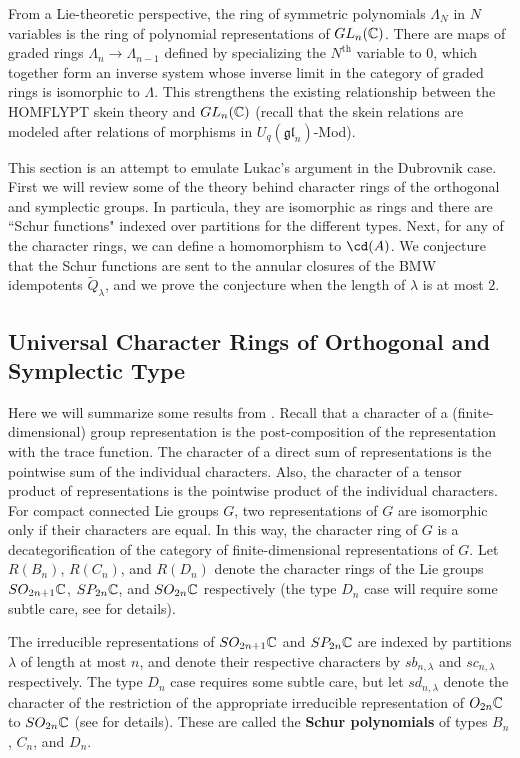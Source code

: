 From a Lie-theoretic perspective, the ring of symmetric polynomials $\Lambda_N$ in $N$ variables is the ring of polynomial representations of $GL_n(\mathbb{C})$. There are maps of graded rings $\Lambda_n \to \Lambda_{n-1}$ defined by specializing the $N^{\mathrm{th}}$ variable to $0$, which together form an inverse system whose inverse limit in the category of graded rings is isomorphic to $\Lambda$. This strengthens the existing relationship between the HOMFLYPT skein theory and $GL_n(\mathbb{C})$ (recall that the skein relations are modeled after relations of morphisms in $U_q(\mathfrak{gl}_n)$-Mod). 

This section is an attempt to emulate Lukac's argument in the Dubrovnik case. First we will review some of the theory behind character rings of the orthogonal and symplectic groups. In particula, they are isomorphic as rings and there are ``Schur functions" indexed over partitions for the different types. Next, for any of the character rings, we can define a homomorphism to $\cd(A)$. We conjecture that the Schur functions are sent to the annular closures of the BMW idempotents $\widetilde{Q}_\lambda$, and we prove the conjecture when the length of $\lambda$ is at most $2$.








\subsection{Universal Character Rings of Orthogonal and Symplectic Type}

Here we will summarize some results from . Recall that a character of a (finite-dimensional) group representation is the post-composition of the representation with the trace function. The character of a direct sum of representations is the pointwise sum of the individual characters. Also, the character of a tensor product of representations is the pointwise product of the individual characters. For compact connected Lie groups $G$, two representations of $G$ are isomorphic only if their characters are equal. In this way, the character ring of $G$ is a decategorification of the category of finite-dimensional representations of $G$. Let $R(B_n)$, $R(C_n)$, and $R(D_n)$ denote the character rings of the Lie groups $SO_{2n+1}\mathbb{C}$, $SP_{2n}\mathbb{C}$, and $SO_{2n}\mathbb{C}$ respectively (the type $D_n$ case will require some subtle care, see  for details). 

The irreducible representations of $SO_{2n+1}\mathbb{C}$ and $SP_{2n}\mathbb{C}$ are indexed by partitions $\lambda$ of length at most $n$, and denote their respective characters by $sb_{n, \lambda}$ and $sc_{n, \lambda}$ respectively. The type $D_n$ case requires some subtle care, but let $sd_{n, \lambda}$ denote the character of the restriction of the appropriate irreducible representation of $O_{2n}\mathbb{C}$ to $SO_{2n}\mathbb{C}$ (see  for details). These are called the \textbf{Schur polynomials} of types $B_n$, $C_n$, and $D_n$.


